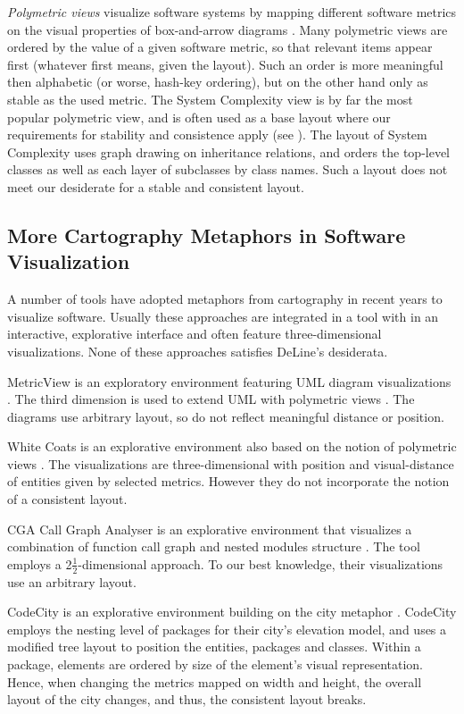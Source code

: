 \emph{Polymetric views} visualize software systems by mapping different software metrics on the visual properties of box-and-arrow diagrams \cite{Lanz03d,Lanz06a}. Many polymetric views are ordered by the 
value of a given software metric, so that relevant items appear first (whatever first means, given the 
layout). Such an order is more meaningful then alphabetic (or worse, hash-key ordering), but on the other hand only as stable as the used metric. The System Complexity view is by far the most popular polymetric view, and is often used as a base layout where our requirements for stability and consistence apply (see \eg \cite{Gree06a}). The layout of System Complexity uses graph drawing on inheritance relations, and orders the top-level classes as well as each layer of subclasses by class names. Such a layout does not meet our desiderate for a stable and consistent layout.
   
\subsection{ More Cartography Metaphors in Software Visualization}\label{sec:other}

A number of tools have adopted metaphors from cartography in recent years to visualize software.
Usually these approaches are integrated in a tool with in an interactive, explorative interface and often feature three-dimensional visualizations. None of these approaches satisfies DeLine's desiderata.

MetricView is an exploratory environment featuring UML diagram visualizations \cite{Term05a}. The third dimension is used to extend UML with polymetric views \cite{Lanz03d}.
The diagrams use arbitrary layout, so do not reflect meaningful distance or position.

White Coats is an explorative environment also based on the notion of polymetric views \cite{Mesn05b}. The visualizations are three-dimensional with position and visual-distance of entities given by selected metrics. However they do not incorporate the notion of a consistent layout.

CGA Call Graph Analyser is an explorative environment that visualizes a combination of function call graph and nested modules structure \cite{Bohn07a}. The tool employs a 2$\frac{1}{2}$-dimensional approach. To our best knowledge, their visualizations use an arbitrary layout.

CodeCity is an explorative environment building on the city metaphor \cite{Wett07b}. CodeCity employs the nesting level of packages for their city's elevation model, and uses a modified tree layout to position the entities, \ie packages and classes. Within a package, elements are ordered by size of the element's visual representation. Hence, when changing the metrics mapped on width and height, the overall layout of the city changes, and thus, the consistent layout breaks.

